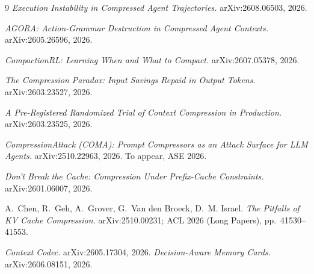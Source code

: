 \documentclass[11pt]{article}
\begin{document}
\begin{thebibliography}{9}
 \emph{Execution Instability in Compressed Agent Trajectories.}
arXiv:2608.06503, 2026.

 \emph{AGORA: Action-Grammar Destruction in Compressed Agent Contexts.}
arXiv:2605.26596, 2026.

 \emph{CompactionRL: Learning When and What to Compact.}
arXiv:2607.05378, 2026.

 \emph{The Compression Paradox: Input Savings Repaid in Output
Tokens.} arXiv:2603.23527, 2026.

 \emph{A Pre-Registered Randomized Trial of Context Compression in
Production.} arXiv:2603.23525, 2026.

 \emph{CompressionAttack (COMA): Prompt Compressors as an Attack Surface for
LLM Agents.} arXiv:2510.22963, 2026. To appear, ASE 2026.

 \emph{Don't Break the Cache: Compression Under Prefix-Cache
Constraints.} arXiv:2601.06007, 2026.

 A.~Chen, R.~Geh, A.~Grover, G.~Van den Broeck, D.~M. Israel.
\emph{The Pitfalls of KV Cache Compression.} arXiv:2510.00231; ACL 2026 (Long Papers),
pp.~41530--41553.

 \emph{Context Codec.} arXiv:2605.17304, 2026.
 \emph{Decision-Aware Memory Cards.} arXiv:2606.08151, 2026.
\end{thebibliography}
\end{document}
